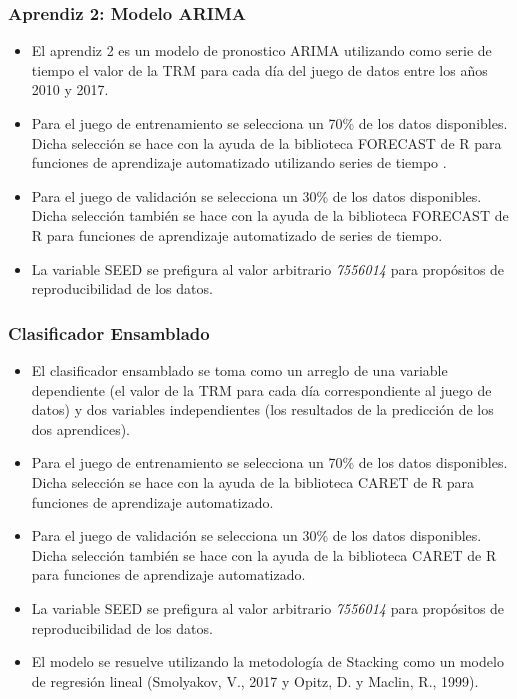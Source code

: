 \subsubsection{Aprendiz 2: Modelo ARIMA}
\begin{itemize}
	\item El aprendiz 2 es un modelo de pronostico ARIMA utilizando como serie de tiempo el valor de la TRM para cada día del juego de datos entre los años 2010 y 2017.
	\item Para el juego de entrenamiento se selecciona un 70\% de los datos disponibles. Dicha selección se hace con la ayuda de la biblioteca FORECAST de R para funciones de aprendizaje automatizado utilizando series de tiempo \cite{hyndman}. 
	\item Para el juego de validación se selecciona un 30\% de los datos disponibles. Dicha selección también se hace con la ayuda de la biblioteca FORECAST de R para funciones de aprendizaje automatizado de series de tiempo. 
	\item La variable SEED se prefigura al valor arbitrario \emph{7556014} para propósitos de reproducibilidad de los datos. 
\end{itemize}

\subsubsection{Clasificador Ensamblado}
\begin{itemize}
	\item El clasificador ensamblado se toma como un arreglo de una variable dependiente (el valor de la TRM para cada día correspondiente al juego de datos) y dos variables independientes (los resultados de la predicción de los dos aprendices). 
	\item Para el juego de entrenamiento se selecciona un 70\% de los datos disponibles. Dicha selección se hace con la ayuda de la biblioteca CARET de R para funciones de aprendizaje automatizado. 
	\item Para el juego de validación se selecciona un 30\% de los datos disponibles. Dicha selección también se hace con la ayuda de la biblioteca CARET de R para funciones de aprendizaje automatizado. 
	\item La variable SEED se prefigura al valor arbitrario \emph{7556014} para propósitos de reproducibilidad de los datos. 
	\item El modelo se resuelve utilizando la metodología de Stacking como un modelo de regresión lineal (Smolyakov, V., 2017 y Opitz, D. y Maclin, R., 1999).
\end{itemize}

